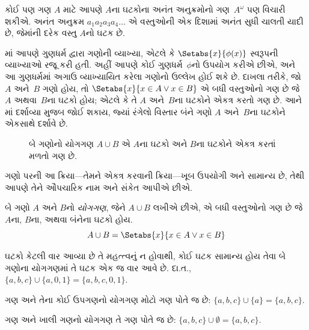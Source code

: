 \begin{ex}[અનંત અનુક્રમો]
કોઈ પણ ગણ $A$ માટે આપણે $A$ના ઘટકોના અનંત અનુક્રમોનો ગણ~$A^\omega$
પણ વિચારી શકીએ. અનંત અનુક્રમ $a_1a_2a_3a_4\dots$ એ વસ્તુઓની એક
દિશામાં અનંત સુધી ચાલતી યાદી છે, જેમાંની દરેક વસ્તુ $A$નો ઘટક છે.
\end{ex}
\endgroup


\begingroup
\makeatletter{}\makeatother

\label{guunit:OLP-0008}


\begin{explain}
માં આપણે ગુણધર્મ દ્વારા ગણોની વ્યાખ્યા,
એટલે કે $\Setabs{x}{\phi(x)}$ સ્વરૂપની વ્યાખ્યાઓ રજૂ કરી હતી.
અહીં આપણે કોઈ ગુણધર્મ~$\phi$નો ઉપયોગ કરીએ છીએ, અને આ ગુણધર્મમાં
અગાઉ વ્યાખ્યાયિત કરેલા ગણોનો ઉલ્લેખ હોઈ શકે છે.
દાખલા તરીકે, જો $A$ અને~$B$ ગણો હોય, તો
$\Setabs{x}{x \in A \lor x \in B}$ એ બધી વસ્તુઓનો ગણ છે જે $A$ અથવા~$B$ના
ઘટકો હોય; એટલે કે તે $A$ અને~$B$ના ઘટકોને એકત્ર કરતો ગણ છે.
આને માં દર્શાવ્યા મુજબ જોઈ શકાય, જ્યાં રંગેલો વિસ્તાર
બંને ગણો $A$ અને~$B$ના ઘટકોને એકસાથે દર્શાવે છે.

\begin{figure}
  \caption{બે ગણોનો યોગગણ $A \cup B$ એ $A$ના ઘટકો અને
  $B$ના ઘટકોને એકત્ર કરતાં મળતો ગણ છે.}
\end{figure}

ગણો પરની આ ક્રિયા---તેમને એકત્ર કરવાની ક્રિયા---ખૂબ ઉપયોગી અને સામાન્ય છે,
તેથી આપણે તેને ઔપચારિક નામ અને સંકેત આપીએ છીએ.
\end{explain}

\begin{defn}[યોગગણ]
બે ગણો $A$ અને $B$નો \emph{યોગગણ}, જેને $A \cup B$ લખીએ છીએ,
એ બધી વસ્તુઓનો ગણ છે જે $A$ના, $B$ના, અથવા બંનેના ઘટકો હોય.
\[
A \cup B = \Setabs{x}{x \in A \lor x \in B}
\]
\end{defn}

\begin{ex}
ઘટકો કેટલી વાર આવ્યા છે તે મહત્ત્વનું ન હોવાથી, કોઈ ઘટક
સામાન્ય હોય તેવા બે ગણોના યોગગણમાં તે ઘટક એક જ વાર આવે છે.
દા.ત., $\{ a, b, c\} \cup \{ a, 0, 1\} = \{a, b, c, 0, 1\}$.

ગણ અને તેના કોઈ ઉપગણનો યોગગણ મોટો ગણ પોતે જ છે:
$\{a, b, c \} \cup \{a \} = \{a, b, c\}$.

ગણ અને ખાલી ગણનો યોગગણ તે ગણ પોતે જ છે:
$\{a, b, c \} \cup \emptyset = \{a, b, c \}$.
\end{ex}

